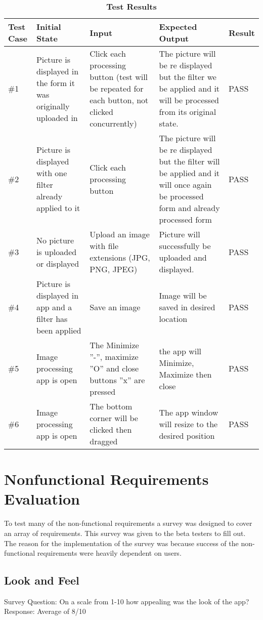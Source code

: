 \documentclass[12pt, titlepage]{article}
\begin{document}
\begin{table}[h]
\scriptsize
\caption{\bf Test Results}
\begin{tabu} to 1.1\textwidth { | X[.3] | X[.7] | X[.7] | X[.7] | X[.3] |}
\hline
	      		Test Case & Initial State & Input & Expected Output & Result \\
\hline
\#1 
&Picture is displayed in the form it was originally uploaded in
& Click each processing button (test will be repeated for each button, not clicked concurrently)
& The picture will be re displayed but the filter we be applied and it will be processed from its original state.
& PASS\\
\hline
\#2
&Picture is displayed with one filter already applied to it
& Click each processing button
& The picture will be re displayed but the filter will be applied and it will once again be processed form and already processed form
&PASS\\
\hline
\#3
&No picture is uploaded or displayed
& Upload an image with file extensions (JPG, PNG, JPEG)
& Picture will successfully be uploaded and displayed.
& PASS\\
\hline
\#4
& Picture is displayed in app and a filter has been applied
& Save an image
& Image will be saved in desired location
& PASS\\
\hline
\#5
& Image processing app is open
& The Minimize ''-'', maximize  ''O'' and close buttons ''x'' are pressed
& the app will Minimize, Maximize then close
& PASS\\
\hline
\#6
& Image processing app is open
& The bottom corner will be clicked then dragged
& The app window will resize to the desired position
& PASS\\
\hline
	\end{tabu}
	\end{table}

\section{Nonfunctional Requirements Evaluation}
To test many of the non-functional requirements a survey was designed to cover an array of requirements. This survey was given to the beta testers to fill out. The reason for the implementation of the survey was because success of the non-functional requirements were heavily dependent on users.

\subsection{Look and Feel}
\noindent Survey Question: On a scale from 1-10 how appealing was the look of the app?\\
Response: Average of 8/10
\end{document}

